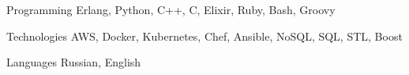 

\begin{cvskills}

  \cvskill
    {Programming} %
    {Erlang, Python, C++, C, Elixir, Ruby, Bash, Groovy} %

  \cvskill
    {Technologies} %
    {AWS, Docker, Kubernetes, Chef, Ansible, NoSQL, SQL, STL, Boost} %

  \cvskill
    {Languages} %
    {Russian, English} %

\end{cvskills}
